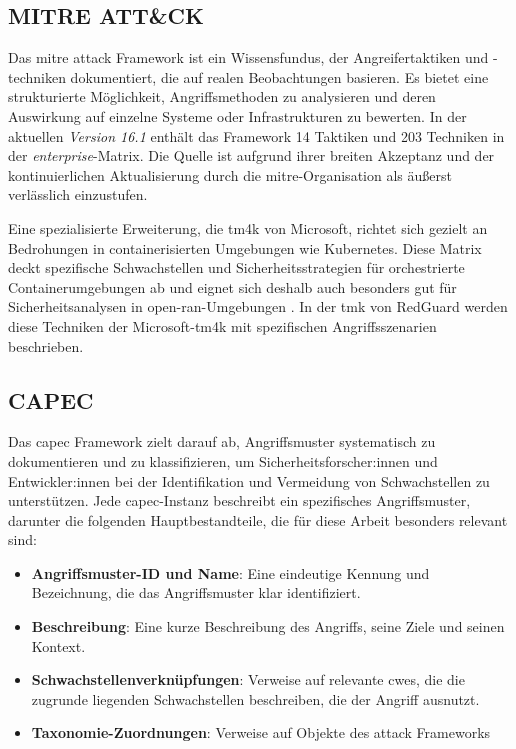 \subsection{MITRE ATT\&CK}
Das \gls{mitre} \gls{attack} Framework ist ein Wissensfundus, der Angreifertaktiken und -techniken dokumentiert, die auf realen Beobachtungen basieren. Es bietet eine strukturierte Möglichkeit, Angriffsmethoden zu analysieren und deren Auswirkung auf einzelne Systeme oder Infrastrukturen zu bewerten. In der aktuellen \textit{Version 16.1} enthält das Framework 14 Taktiken und 203 Techniken in der \textit{enterprise}-Matrix. Die Quelle ist aufgrund ihrer breiten Akzeptanz und der kontinuierlichen Aktualisierung durch die \gls{mitre}-Organisation als äußerst verlässlich einzustufen. \par Eine spezialisierte Erweiterung, die \gls{tm4k} von Microsoft, richtet sich gezielt an Bedrohungen in containerisierten Umgebungen wie Kubernetes. Diese Matrix deckt spezifische Schwachstellen und Sicherheitsstrategien für orchestrierte Containerumgebungen ab und eignet sich deshalb auch besonders gut für Sicherheitsanalysen in \gls{open-ran}-Umgebungen \autocite{MITREATTCK,KubernetesThreatMatrix}. In der \gls{tmk} von RedGuard werden diese Techniken der Microsoft-\gls{tm4k} mit spezifischen Angriffsszenarien beschrieben.

\subsection{CAPEC}
\label{bg:capec}
Das \gls{capec} Framework zielt darauf ab, Angriffsmuster systematisch zu dokumentieren und zu klassifizieren, um Sicherheitsforscher:innen und Entwickler:innen bei der Identifikation und Vermeidung von Schwachstellen zu unterstützen. Jede \gls{capec}-Instanz beschreibt ein spezifisches Angriffsmuster, darunter die folgenden Hauptbestandteile, die für diese Arbeit besonders relevant sind:

\begin{itemize}
    \item \textbf{Angriffsmuster-ID und Name}: Eine eindeutige Kennung und Bezeichnung, die das Angriffsmuster klar identifiziert.
    \item \textbf{Beschreibung}: Eine kurze Beschreibung des Angriffs, seine Ziele und seinen Kontext.
    \item \textbf{Schwachstellenverknüpfungen}: Verweise auf relevante \glspl{cwe}, die die zugrunde liegenden Schwachstellen beschreiben, die der Angriff ausnutzt.
    \item \textbf{Taxonomie-Zuordnungen}: Verweise auf Objekte des \gls{attack} Frameworks
\end{itemize}

